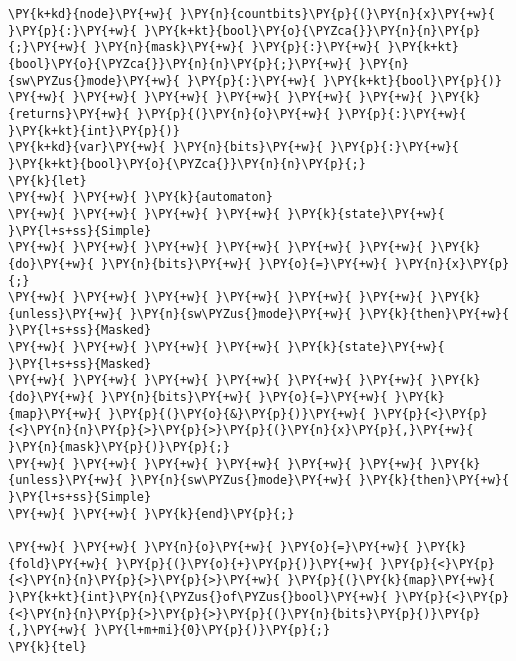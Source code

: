 \begin{Verbatim}[commandchars=\\\{\}]
\PY{k+kd}{node}\PY{+w}{ }\PY{n}{countbits}\PY{p}{(}\PY{n}{x}\PY{+w}{ }\PY{p}{:}\PY{+w}{ }\PY{k+kt}{bool}\PY{o}{\PYZca{}}\PY{n}{n}\PY{p}{;}\PY{+w}{ }\PY{n}{mask}\PY{+w}{ }\PY{p}{:}\PY{+w}{ }\PY{k+kt}{bool}\PY{o}{\PYZca{}}\PY{n}{n}\PY{p}{;}\PY{+w}{ }\PY{n}{sw\PYZus{}mode}\PY{+w}{ }\PY{p}{:}\PY{+w}{ }\PY{k+kt}{bool}\PY{p}{)}
\PY{+w}{ }\PY{+w}{ }\PY{+w}{ }\PY{+w}{ }\PY{+w}{ }\PY{+w}{ }\PY{k}{returns}\PY{+w}{ }\PY{p}{(}\PY{n}{o}\PY{+w}{ }\PY{p}{:}\PY{+w}{ }\PY{k+kt}{int}\PY{p}{)}
\PY{k+kd}{var}\PY{+w}{ }\PY{n}{bits}\PY{+w}{ }\PY{p}{:}\PY{+w}{ }\PY{k+kt}{bool}\PY{o}{\PYZca{}}\PY{n}{n}\PY{p}{;}
\PY{k}{let}
\PY{+w}{ }\PY{+w}{ }\PY{k}{automaton}
\PY{+w}{ }\PY{+w}{ }\PY{+w}{ }\PY{+w}{ }\PY{k}{state}\PY{+w}{ }\PY{l+s+ss}{Simple}
\PY{+w}{ }\PY{+w}{ }\PY{+w}{ }\PY{+w}{ }\PY{+w}{ }\PY{+w}{ }\PY{k}{do}\PY{+w}{ }\PY{n}{bits}\PY{+w}{ }\PY{o}{=}\PY{+w}{ }\PY{n}{x}\PY{p}{;}
\PY{+w}{ }\PY{+w}{ }\PY{+w}{ }\PY{+w}{ }\PY{+w}{ }\PY{+w}{ }\PY{k}{unless}\PY{+w}{ }\PY{n}{sw\PYZus{}mode}\PY{+w}{ }\PY{k}{then}\PY{+w}{ }\PY{l+s+ss}{Masked}
\PY{+w}{ }\PY{+w}{ }\PY{+w}{ }\PY{+w}{ }\PY{k}{state}\PY{+w}{ }\PY{l+s+ss}{Masked}
\PY{+w}{ }\PY{+w}{ }\PY{+w}{ }\PY{+w}{ }\PY{+w}{ }\PY{+w}{ }\PY{k}{do}\PY{+w}{ }\PY{n}{bits}\PY{+w}{ }\PY{o}{=}\PY{+w}{ }\PY{k}{map}\PY{+w}{ }\PY{p}{(}\PY{o}{&}\PY{p}{)}\PY{+w}{ }\PY{p}{<}\PY{p}{<}\PY{n}{n}\PY{p}{>}\PY{p}{>}\PY{p}{(}\PY{n}{x}\PY{p}{,}\PY{+w}{ }\PY{n}{mask}\PY{p}{)}\PY{p}{;}
\PY{+w}{ }\PY{+w}{ }\PY{+w}{ }\PY{+w}{ }\PY{+w}{ }\PY{+w}{ }\PY{k}{unless}\PY{+w}{ }\PY{n}{sw\PYZus{}mode}\PY{+w}{ }\PY{k}{then}\PY{+w}{ }\PY{l+s+ss}{Simple}
\PY{+w}{ }\PY{+w}{ }\PY{k}{end}\PY{p}{;}

\PY{+w}{ }\PY{+w}{ }\PY{n}{o}\PY{+w}{ }\PY{o}{=}\PY{+w}{ }\PY{k}{fold}\PY{+w}{ }\PY{p}{(}\PY{o}{+}\PY{p}{)}\PY{+w}{ }\PY{p}{<}\PY{p}{<}\PY{n}{n}\PY{p}{>}\PY{p}{>}\PY{+w}{ }\PY{p}{(}\PY{k}{map}\PY{+w}{ }\PY{k+kt}{int}\PY{n}{\PYZus{}of\PYZus{}bool}\PY{+w}{ }\PY{p}{<}\PY{p}{<}\PY{n}{n}\PY{p}{>}\PY{p}{>}\PY{p}{(}\PY{n}{bits}\PY{p}{)}\PY{p}{,}\PY{+w}{ }\PY{l+m+mi}{0}\PY{p}{)}\PY{p}{;}
\PY{k}{tel}
\end{Verbatim}
